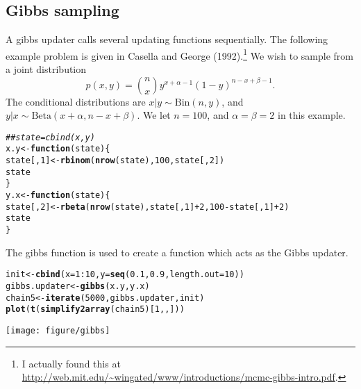 \documentclass{article}\usepackage[]{graphicx}\usepackage[]{color}
\makeatletter
\newcommand{\hlnum}[1]{\textcolor[rgb]{0.686,0.059,0.569}{#1}}%
\newcommand{\hlcom}[1]{\textcolor[rgb]{0.678,0.584,0.686}{\textit{#1}}}%
\newcommand{\hlopt}[1]{\textcolor[rgb]{0,0,0}{#1}}%
\newcommand{\hlstd}[1]{\textcolor[rgb]{0.345,0.345,0.345}{#1}}%
\newcommand{\hlkwa}[1]{\textcolor[rgb]{0.161,0.373,0.58}{\textbf{#1}}}%
\newcommand{\hlkwb}[1]{\textcolor[rgb]{0.69,0.353,0.396}{#1}}%
\newcommand{\hlkwc}[1]{\textcolor[rgb]{0.333,0.667,0.333}{#1}}%
\newcommand{\hlkwd}[1]{\textcolor[rgb]{0.737,0.353,0.396}{\textbf{#1}}}%
\newenvironment{kframe}{%
 \def\at@end@of@kframe{}%
 \ifinner\ifhmode%
  \def\at@end@of@kframe{\end{minipage}}%
  \begin{minipage}{\columnwidth}%
 \fi\fi%
 \def\FrameCommand##1{\hskip\@totalleftmargin \hskip-\fboxsep
 \colorbox{shadecolor}{##1}\hskip-\fboxsep
     \hskip-\linewidth \hskip-\@totalleftmargin \hskip\columnwidth}%
 \MakeFramed {\advance\hsize-\width
   \@totalleftmargin\z@ \linewidth\hsize
   \@setminipage}}%
 {\par\unskip\endMakeFramed%
 \at@end@of@kframe}
\newenvironment{knitrout}{}{} %
\makeatother
\begin{document}
\subsection{Gibbs sampling}
\label{sec:gibbs-sampling}


A gibbs updater calls several updating functions sequentially.  The
following example problem is given in Casella and George
(1992).\footnote{I actually found this at
  \url{http://web.mit.edu/~wingated/www/introductions/mcmc-gibbs-intro.pdf}.}
We wish to sample from a joint distribution
\[p(x, y) = {n \choose x} y^{x+\alpha-1} (1-y)^{n-x+\beta-1}.\]
The conditional distributions are 
$x|y \sim \text{Bin}(n, y)$, and $y |x \sim \text{Beta}(x +
\alpha, n-x+\beta)$. We let $n=100$, and $\alpha=\beta=2$ in this example.
\begin{knitrout}
\color{fgcolor}\begin{kframe}
\begin{alltt}
\hlcom{## state = cbind(x,y)}
\hlstd{x.y} \hlkwb{<-} \hlkwa{function}\hlstd{(}\hlkwc{state}\hlstd{) \{}
    \hlstd{state[,} \hlnum{1}\hlstd{]} \hlkwb{<-} \hlkwd{rbinom}\hlstd{(}\hlkwd{nrow}\hlstd{(state),} \hlnum{100}\hlstd{, state[,} \hlnum{2}\hlstd{])}
    \hlstd{state}
\hlstd{\}}
\hlstd{y.x} \hlkwb{<-} \hlkwa{function}\hlstd{(}\hlkwc{state}\hlstd{) \{}
    \hlstd{state[,} \hlnum{2}\hlstd{]} \hlkwb{<-} \hlkwd{rbeta}\hlstd{(}\hlkwd{nrow}\hlstd{(state), state[,} \hlnum{1}\hlstd{]} \hlopt{+} \hlnum{2}\hlstd{,} \hlnum{100} \hlopt{-} \hlstd{state[,} \hlnum{1}\hlstd{]} \hlopt{+} \hlnum{2}\hlstd{)}
    \hlstd{state}
\hlstd{\}}
\end{alltt}
\end{kframe}
\end{knitrout}

The gibbs function is used to create a function which acts as the
Gibbs updater.

\begin{knitrout}
\color{fgcolor}\begin{kframe}
\begin{alltt}
\hlstd{init} \hlkwb{<-} \hlkwd{cbind}\hlstd{(}\hlkwc{x} \hlstd{=} \hlnum{1}\hlopt{:}\hlnum{10}\hlstd{,} \hlkwc{y} \hlstd{=} \hlkwd{seq}\hlstd{(}\hlnum{0.1}\hlstd{,} \hlnum{0.9}\hlstd{,} \hlkwc{length.out} \hlstd{=} \hlnum{10}\hlstd{))}
\hlstd{gibbs.updater} \hlkwb{<-} \hlkwd{gibbs}\hlstd{(x.y, y.x)}
\hlstd{chain5} \hlkwb{<-} \hlkwd{iterate}\hlstd{(}\hlnum{5000}\hlstd{, gibbs.updater, init)}
\hlkwd{plot}\hlstd{(}\hlkwd{t}\hlstd{(}\hlkwd{simplify2array}\hlstd{(chain5)[}\hlnum{1}\hlstd{, , ]))}
\end{alltt}
\end{kframe}

{\centering \texttt{[image: figure/gibbs]} 

}



\end{knitrout}
\end{document}
